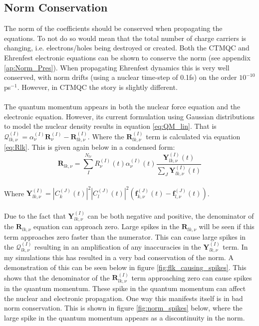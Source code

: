 \subsection{Norm Conservation}
The norm of the coefficients should be conserved when propagating the equations. To not do so would mean that the total number of charge carriers is changing, i.e. electrons/holes being destroyed or created. Both the CTMQC and Ehrenfest electronic equations can be shown to conserve the norm (see appendix \ref{ap:Norm_Pres}). When propagating Ehrenfest dynamics this is very well conserved, with norm drifts (using a nuclear time-step of 0.1fs) on the order $10^{-10}$ ps$^{-1}$. However, in CTMQC the story is slightly different.
\\\\
The quantum momentum appears in both the nuclear force equation and the electronic equation. However, its current formulation using Gaussian distributions to model the nuclear density results in equation \eqref{eq:QM_lin}. That is $\mathcal{Q}_{lk,\nu}^{(I)} = \alpha_{\nu}^{(I)}\textbf{R}^{(I)}_\nu - \textbf{R}^{(I)}_{lk, \nu}$. Where the $\textbf{R}^{(I)}_{lk, \nu}$ term is calculated via equation \eqref{eq:Rlk}. This is given again below in a condensed form:
\[\textbf{R}_{lk, \nu} = \sum_{I}^{N_{tr}} R_{\nu}^{(I)}(t) \alpha_{\nu}^{(I)}(t) \frac{\textbf{Y}^{(I)}_{lk, \nu}(t)}{\sum_{J} \textbf{Y}^{(I)}_{lk, \nu}(t)} \]
\\
Where $\textbf{Y}^{(I)}_{lk, \nu} = |C_{k}^{(J)}(t)|^2 |C_{l}^{(J)}(t)|^2 \left( \textbf{f}_{k, \nu}^{(J)}(t) - \textbf{f}_{l, \nu}^{(J)}(t) \right)$.
\\\\
Due to the fact that $\textbf{Y}^{(I)}_{lk, \nu}$ can be both negative and positive, the denominator of the $\textbf{R}_{lk, \nu}$ equation can approach zero. Large spikes in the $\textbf{R}_{lk, \nu}$ will be seen if this term approaches zero faster than the numerator. This can cause large spikes in the $\mathcal{Q}_{lk,\nu}^{(I)}$ resulting in an amplification of any inaccuracies in the $\textbf{Y}^{(I)}_{lk, \nu}$ term. In my simulations this has resulted in a very bad conservation of the norm. A demonstration of this can be seen below in figure \ref{fig:flk_causing_spikes}.
This shows that the denominator of the $\textbf{R}^{(I)}_{lk, \nu}$ term approaching zero can cause spikes in the quantum momentum. These spike in the quantum momentum can affect the nuclear and electronic propagation. One way this manifests itself is in bad norm conservation. This is shown in figure \ref{fig:norm_spikes} below, where the large spike in the quantum momentum appears as a discontinuity in the norm.
